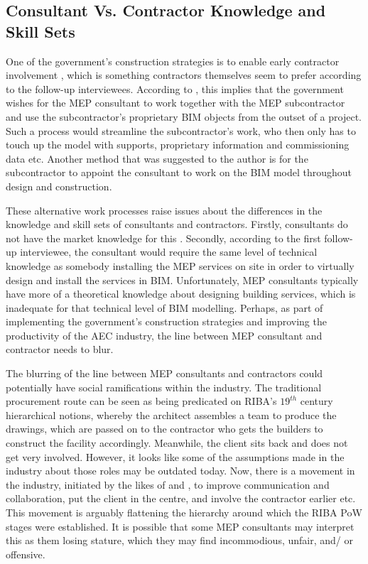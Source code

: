 
\subsection{Consultant Vs. Contractor Knowledge and Skill Sets}

One of the government's construction strategies is to enable early contractor involvement \citep{GCS11-15}, which is something contractors themselves seem to prefer according to the follow-up interviewees.
According to \cite{Conaghan2017}, this implies that the government wishes for the MEP consultant to work together with the MEP subcontractor and use the subcontractor's proprietary BIM objects from the outset of a project.
Such a process would streamline the subcontractor's work, who then only has to touch up the model with supports, proprietary information and commissioning data etc.
Another method that was suggested to the author is for the subcontractor to appoint the consultant to work on the BIM model throughout design and construction.

These alternative work processes raise issues about the differences in the knowledge and skill sets of consultants and contractors.
Firstly, consultants do not have the market knowledge for this \citep{Conaghan2017}.
Secondly, according to the first follow-up interviewee, the consultant would require the same level of technical knowledge as somebody installing the MEP services on site in order to virtually design and install the services in BIM.
Unfortunately, MEP consultants typically have more of a theoretical knowledge about designing building services, which is inadequate for that technical level of BIM modelling.
Perhaps, as part of implementing the government's construction strategies and improving the productivity of the AEC industry, the line between MEP consultant and contractor needs to blur.

The blurring of the line between MEP consultants and contractors could potentially have social ramifications within the industry.
The traditional procurement route can be seen as being predicated on RIBA's $ 19^{th} $ century hierarchical notions, whereby the architect assembles a team to produce the drawings, which are passed on to the contractor who gets the builders to construct the facility accordingly.
Meanwhile, the client sits back and does not get very involved.
However, it looks like some of the assumptions made in the industry about those roles may be outdated today.
Now, there is a movement in the industry, initiated by the likes of \citeauthor{Latham1994} and \citeauthor{Egan1998}, to improve communication and collaboration, put the client in the centre, and involve the contractor earlier etc.
This movement is arguably flattening the hierarchy around which the RIBA PoW stages were established.
It is possible that some MEP consultants may interpret this as them losing stature, which they may find incommodious, unfair, and/ or offensive.

